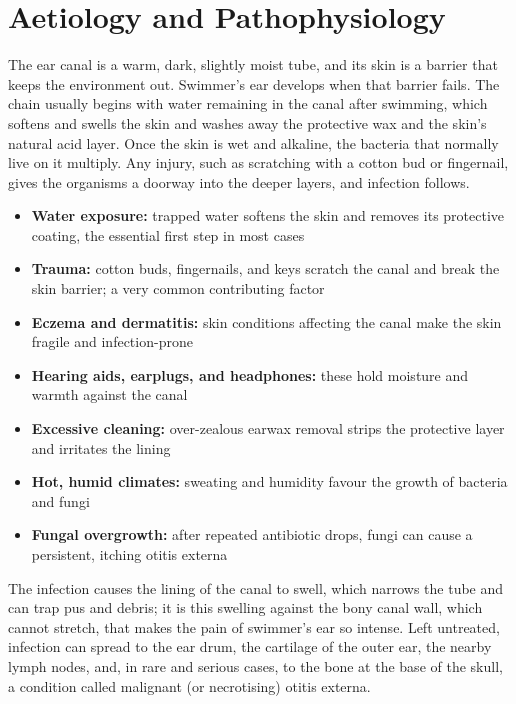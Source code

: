 \section*{Aetiology and Pathophysiology}
The ear canal is a warm, dark, slightly moist tube, and its skin is a barrier that keeps the environment out. Swimmer's ear develops when that barrier fails. The chain usually begins with water remaining in the canal after swimming, which softens and swells the skin and washes away the protective wax and the skin's natural acid layer. Once the skin is wet and alkaline, the bacteria that normally live on it multiply. Any injury, such as scratching with a cotton bud or fingernail, gives the organisms a doorway into the deeper layers, and infection follows.

\begin{itemize}
    \item \textbf{Water exposure:} trapped water softens the skin and removes its protective coating, the essential first step in most cases
    \item \textbf{Trauma:} cotton buds, fingernails, and keys scratch the canal and break the skin barrier; a very common contributing factor
    \item \textbf{Eczema and dermatitis:} skin conditions affecting the canal make the skin fragile and infection-prone
    \item \textbf{Hearing aids, earplugs, and headphones:} these hold moisture and warmth against the canal
    \item \textbf{Excessive cleaning:} over-zealous earwax removal strips the protective layer and irritates the lining
    \item \textbf{Hot, humid climates:} sweating and humidity favour the growth of bacteria and fungi
    \item \textbf{Fungal overgrowth:} after repeated antibiotic drops, fungi can cause a persistent, itching otitis externa
\end{itemize}

The infection causes the lining of the canal to swell, which narrows the tube and can trap pus and debris; it is this swelling against the bony canal wall, which cannot stretch, that makes the pain of swimmer's ear so intense. Left untreated, infection can spread to the ear drum, the cartilage of the outer ear, the nearby lymph nodes, and, in rare and serious cases, to the bone at the base of the skull, a condition called malignant (or necrotising) otitis externa.

